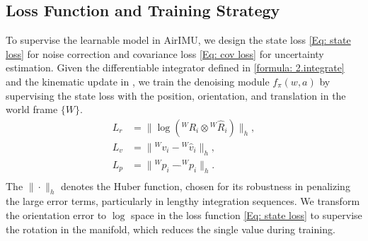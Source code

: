 \subsection{Loss Function and Training Strategy}
\label{Model: Loss}

To supervise the learnable model in AirIMU, we design the state loss \eqref{Eq: state loss} for noise correction and covariance loss \eqref{Eq: cov loss} for uncertainty estimation.
Given the differentiable integrator defined in \eqref{formula: 2.integrate} and the kinematic update in , we train the denoising module $f_\pi(w, a)$ by supervising the state loss with the position, orientation, and translation in the world frame $\{W\}$.
\begin{equation}
\label{Eq: state loss}
    \begin{split}
        L_r &= \| \log({}^W R_i \otimes {}^W \hat R_i) \|_h, \\
        L_v &= \| {}^W v_i -  {}^W \hat v_i \|_h, \\
        L_p &= \| {}^W p_i - \hat {}^W p_i \|_h. \\
    \end{split}
\end{equation}
The $\| \cdot \|_h$ denotes the Huber function, chosen for its robustness in penalizing the large error terms, particularly in lengthy integration sequences.
We transform the orientation error to $\log$ space in the loss function \eqref{Eq: state loss} to supervise the rotation in the manifold, which reduces the single value during training.

